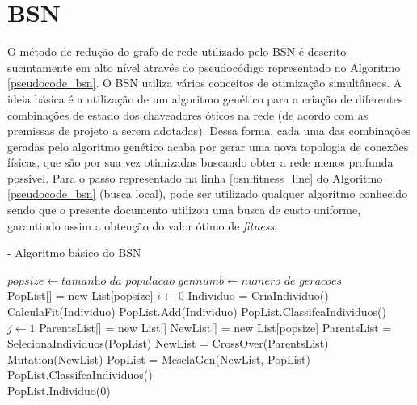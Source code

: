 
\section{BSN}
O método de redução do grafo de rede utilizado pelo BSN é descrito sucintamente em alto nível através do pseudocódigo representado no Algoritmo \ref{pseudocode_bsn}. O BSN utiliza vários conceitos de otimização simultâneos. A ideia básica é a utilização de um algoritmo genético para a criação de diferentes combinações de estado dos chaveadores óticos na rede (de acordo com as premissas de projeto a serem adotadas). Dessa forma, cada uma das combinações geradas pelo algoritmo genético acaba por gerar uma nova topologia de conexões físicas, que são por sua vez otimizadas buscando obter a rede menos profunda possível. Para o passo representado na linha \ref{bsn:fitness_line} do Algoritmo \ref{pseudocode_bsn} (busca local), pode ser utilizado qualquer algoritmo conhecido sendo que o presente documento utilizou uma busca de custo uniforme, garantindo assim a obtenção do valor ótimo de \emph{fitness}.

\begin{algorithm} [h]
\caption{ - Algoritmo básico do BSN}
\begin{algorithmic}[1]
\State $popsize\gets \textit{tamanho da populacao}$
\State $gennumb\gets \textit{numero de geracoes}$\\
\State PopList[] = new List[popsize]
\State $i\gets 0$
\State Individuo = CriaIndividuo()
\State CalculaFit(Individuo)\label{bsn:fitness_line}
\State PopList.Add(Individuo)
\State PopList.ClassifcaIndividuos()
\EndWhile{}\\
\State $j\gets 1$
\State ParentsList[] = new List[]
\State NewList[] = new List[popsize]
\State ParentsList = SelecionaIndividuos(PopList)
\State NewList = CrossOver(ParentsList)
\State Mutation(NewList)
\State PopList = MesclaGen(NewList, PopList)
\State PopList.ClassifcaIndividuos()
\EndWhile\\
\State\Return PopList.Individuo(0)
\end{algorithmic}
\label{pseudocode_bsn}
\end{algorithm}

